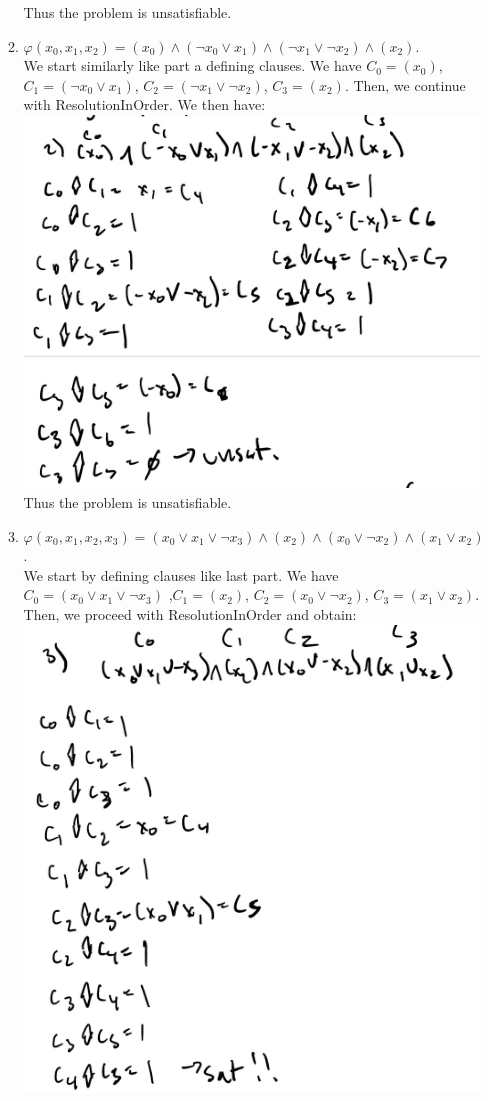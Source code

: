 \documentclass[11pt]{article}
\begin{document}
\begin{enumerate}
\begin{enumerate}
      Thus the problem is unsatisfiable. 

      \item $\varphi(x_0, x_1, x_2) = (x_0) \wedge (\neg x_0 \vee x_1) \wedge (\neg x_1 \vee \neg x_2) \wedge (x_2)$.\\
      
      We start similarly like part a defining clauses. We have $C_0 = (x_0)$, $C_1 = (\neg x_0 \vee x_1)$, $C_2 = (\neg x_1 \vee \neg x_2)$, $C_3 = (x_2)$. Then, we continue with ResolutionInOrder. We then have: \\
      
      \includegraphics[width=.6\textwidth]{fall2022/psets/ps7/IMG_0017.jpg} \\
      
      Thus the problem is unsatisfiable. 
      
      
      \item $\varphi(x_0, x_1, x_2, x_3) = (x_0 \vee x_1 \vee \neg x_3) \wedge (x_2) \wedge (x_0 \vee \neg x_2) \wedge (x_1 \vee x_2)$. \\
      
      We start by defining clauses like last part. We have $C_0 =  (x_0 \vee x_1 \vee \neg x_3)$ ,$C_1 = (x_2)$, $C_2 = (x_0 \vee \neg x_2)$, $C_3 = (x_1 \vee x_2)$. Then, we proceed with ResolutionInOrder and obtain: \\
      
      \includegraphics[width=.6\textwidth]{fall2022/psets/ps7/IMG_0018.jpg} \\
      

\end{enumerate}
\end{enumerate}
\end{document}
